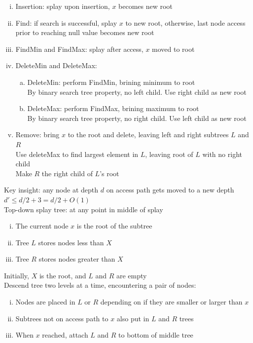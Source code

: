 \documentclass{article}
\begin{document}
			\begin{enumerate}[(i)]
				\item Insertion: splay upon insertion, $x$ becomes new root
				\item Find: if search is successful, splay $x$ to new root, otherwise, last node access prior to reaching null value becomes new root
				\item FindMin and FindMax: splay after access, $x$ moved to root
				\item DeleteMin and DeleteMax:
				\begin{enumerate}[(a)]
					\item DeleteMin: perform FindMin, brining minimum to root \\
					By binary search tree property, no left child. Use right child as new root
					\item DeleteMax: perform FindMax, brining maximum to root \\
					By binary search tree property, no right child. Use left child as new root
					\end{enumerate}
				\item Remove: bring $x$ to the root and delete, leaving left and right subtrees $L$ and $R$ \\
				Use deleteMax to find largest element in $L$, leaving root of $L$ with no right child \\
				Make $R$ the right child of $L$'s root
				\end{enumerate}
			Key insight: any node at depth $d$ on access path gets moved to a new depth $d' \leq d/2 + 3 = d/2 + O(1)$ \\
			Top-down splay tree: at any point in middle of splay
			\begin{enumerate}[(i)]
				\item The current node $x$ is the root of the subtree
				\item Tree $L$ stores nodes less than $X$
				\item Tree $R$ stores nodes greater than $X$
				\end{enumerate}
			Initially, $X$ is the root, and $L$ and $R$ are empty \\
			Descend tree two levels at a time, encountering a pair of nodes: \\
			\begin{enumerate}[(i)]
				\item Nodes are placed in $L$ or $R$ depending on if they are smaller or larger than $x$
				\item Subtrees not on access path to $x$ also put in $L$ and $R$ trees
				\item When $x$ reached, attach $L$ and $R$ to bottom of middle tree
				\end{enumerate}
\end{document}
